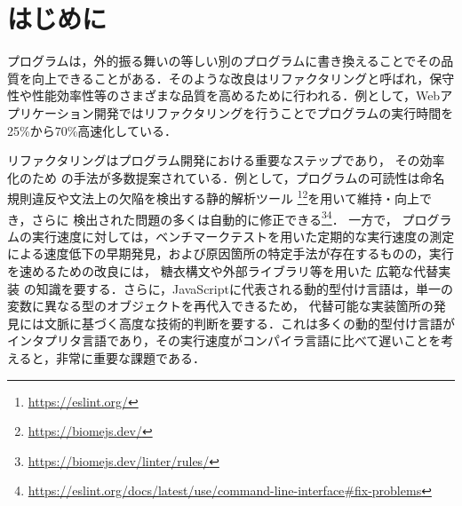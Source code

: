 \documentclass[submit,techrep,noauthor]{ipsj}
\newcommand{\todo}[1]{\colorbox{yellow}{{\bf TODO}:}{\color{red} {\textbf{[#1]}}}}
\begin{document}
\section{はじめに}
プログラムは，外的振る舞いの等しい別のプログラムに書き換えることでその品質を向上できることがある．そのような改良はリファクタリングと呼ばれ，保守性や性能効率性等のさまざまな品質を高めるために行われる．例として，Webアプリケーション開発ではリファクタリングを行うことでプログラムの実行時間を25\%から70\%高速化している\cite{Selakovic_2016}．

リファクタリングはプログラム開発における重要なステップであり，%
その効率化のため%
の手法が多数提案されている．例として，プログラムの可読性は命名規則違反や文法上の欠陥を検出する静的解析ツール%
\footnote{\url{https://eslint.org/}}\footnote{\url{https://biomejs.dev/}}を用いて維持・向上でき，さらに
検出された問題の多くは自動的に修正できる\footnote{\url{https://biomejs.dev/linter/rules/}}\footnote{\url{https://eslint.org/docs/latest/use/command-line-interface#fix-problems}}．%
一方で，%
プログラムの実行速度に対しては，ベンチマークテストを用いた定期的な実行速度の測定による速度低下の早期発見，および原因箇所の特定手法が存在するものの，実行を速めるための改良には，%
糖衣構文や外部ライブラリ等を用いた
広範な代替実装
の知識を要する．さらに，JavaScriptに代表される動的型付け言語は，単一の変数に異なる型のオブジェクトを再代入できるため，
代替可能な実装箇所の発見には文脈に基づく高度な技術的判断を要する．これは多くの動的型付け言語がインタプリタ言語であり，その実行速度がコンパイラ言語に比べて遅いことを考えると，非常に重要な課題である．%
\end{document}
